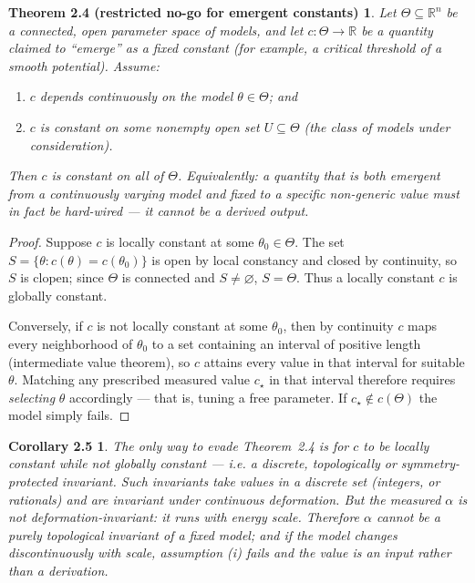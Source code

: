 \documentclass[11pt]{article}
\newtheorem*{thmno}{Theorem 2.4 (restricted no-go for emergent constants)}
\newtheorem*{coro}{Corollary 2.5}
\begin{document}
\begin{thmno}
Let $\Theta\subseteq\mathbb{R}^n$ be a connected, open parameter space of models,
and let $c:\Theta\to\mathbb{R}$ be a quantity claimed to ``emerge'' as a fixed
constant (for example, a critical threshold of a smooth potential). Assume:
\begin{enumerate}[label=(\roman*),leftmargin=1.6em]
\item $c$ depends continuously on the model $\theta\in\Theta$; and
\item $c$ is constant on some nonempty open set $U\subseteq\Theta$ (the class of
models under consideration).
\end{enumerate}
Then $c$ is constant on all of $\Theta$. Equivalently: a quantity that is both
\emph{emergent from a continuously varying model} and \emph{fixed to a specific
non-generic value} must in fact be hard-wired --- it cannot be a derived output.
\end{thmno}
\begin{proof}
Suppose $c$ is locally constant at some $\theta_0\in\Theta$. The set
$S=\{\theta: c(\theta)=c(\theta_0)\}$ is open by local constancy and closed by
continuity, so $S$ is clopen; since $\Theta$ is connected and $S\neq\varnothing$,
$S=\Theta$. Thus a locally constant $c$ is globally constant.

Conversely, if $c$ is not locally constant at some $\theta_0$, then by continuity
$c$ maps every neighborhood of $\theta_0$ to a set containing an interval of
positive length (intermediate value theorem), so $c$ attains every value in that
interval for suitable $\theta$. Matching any prescribed measured value
$c_\star$ in that interval therefore requires \emph{selecting} $\theta$
accordingly --- that is, tuning a free parameter. If $c_\star\notin c(\Theta)$ the
model simply fails.
\end{proof}

\begin{coro}
The only way to evade Theorem~2.4 is for $c$ to be \emph{locally constant while
not globally constant} --- i.e. a discrete, topologically or symmetry-protected
invariant. Such invariants take values in a discrete set (integers, or rationals)
and are invariant under continuous deformation. But the measured $\alpha$ is
\emph{not} deformation-invariant: it runs with energy scale. Therefore $\alpha$
cannot be a purely topological invariant of a fixed model; and if the model
changes discontinuously with scale, assumption (i) fails and the value is an input
rather than a derivation.
\end{coro}
\end{document}
